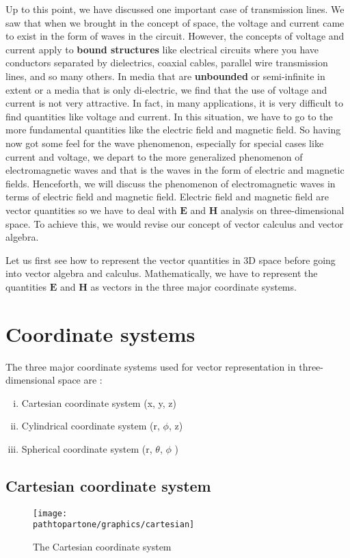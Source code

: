 Up to this point, we have discussed one important case of transmission lines. We saw that when we brought in the concept of space, the voltage and current came to exist in the form of waves in the circuit. However, the concepts of voltage and current apply to \textbf{bound structures} like electrical circuits where you have conductors separated by dielectrics, coaxial cables, parallel wire transmission lines, and so many others. In media that are \textbf{unbounded} or semi-infinite in extent or a media that is only di-electric, we find that the use of voltage and current is not very attractive. In fact, in many applications, it is very difficult to find quantities like voltage and current. In this situation, we have to go to the more fundamental quantities like the electric field and magnetic field. So having now got some feel for the wave phenomenon, especially for special cases like current and voltage, we depart to the more generalized phenomenon of electromagnetic waves and that is the waves in the form of electric and magnetic fields. Henceforth, we will discuss the phenomenon of electromagnetic waves in terms of electric field and magnetic field. Electric field and magnetic field are vector quantities so we have to deal with $\boldsymbol{E}$ and $\boldsymbol{H}$ analysis on three-dimensional space. To achieve this, we would revise our concept of vector calculus and vector algebra.

Let us first see how to represent the vector quantities in 3D space before going into vector algebra and calculus. Mathematically, we have to represent the quantities $\boldsymbol{E}$ and $\boldsymbol{H}$ as vectors in the three major coordinate systems.

\section{Coordinate systems}
The three major coordinate systems  used for vector representation in three-dimensional space are :
\begin{enumerate}[(i)]
\item Cartesian coordinate system (x, y, z)
\item Cylindrical coordinate system (r, $\phi$, z)
\item Spherical coordinate system (r,  $\theta$, $\phi$ )
\end{enumerate}

\subsection{Cartesian coordinate system}
\begin{figure}[h]
\centering
\texttt{[image: \\pathtopartone/graphics/cartesian]}
\caption{The Cartesian  coordinate system}
\end{figure}

